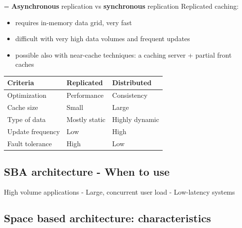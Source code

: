 \begin{flushleft}
  \begin{minipage}[t]{0.49\linewidth}
    \vspace{0pt}

    = \textbf{Asynchronous} replication vs \textbf{synchronous} replication
    Replicated caching:

    \begin{itemize}
      \item requires in-memory data grid, very fast
      \item difficult with very high data volumes and frequent updates
      \item possible also with near-cache techniques: a caching server + partial front caches
    \end{itemize}
  \end{minipage}%
  \hfill%
  \begin{minipage}[t]{0.49\linewidth}
    \vspace{0pt}
    \renewcommand{\arraystretch}{1.4}
    \centering
    \begin{tabular}{l l l}
      \toprule
      \textbf{Criteria} & \textbf{Replicated} & \textbf{Distributed} \\
      \midrule
      Optimization      & Performance         & Consistency          \\
      Cache size        & Small               & Large                \\
      Type of data      & Mostly static       & Highly dynamic       \\
      Update frequency  & Low                 & High                 \\
      Fault tolerance   & High                & Low                  \\
      \bottomrule
    \end{tabular}
  \end{minipage}
\end{flushleft}


\subsection{SBA architecture - When to use}

High volume applications - Large, concurrent user load - Low-latency systems

\subsection{Space based architecture: characteristics}

